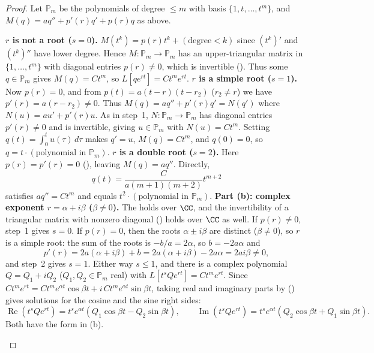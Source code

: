 \documentclass[10pt]{scrartcl}
\begin{document}
\begin{proof}
  Let $\mathbb P_m$ be the polynomials of degree $\le m$ with basis $\{1,t,\dots,t^m\}$, and $M(q)=aq''+p'(r)q'+p(r)q$ as above.
  \begin{steps}
    \ii \textbf{$r$ is not a root ($s=0$).} $M(t^k)=p(r)t^k+(\text{degree}<k)$ since $(t^k)'$ and $(t^k)''$ have lower degree. Hence $M:\mathbb P_m\to\mathbb P_m$ has an upper-triangular matrix in $\{1,\dots,t^m\}$ with diagonal entries $p(r)\neq 0$, which is invertible (). Thus some $q\in\mathbb P_m$ gives $M(q)=Ct^m$, so $L[qe^{rt}]=Ct^me^{rt}$.
    \ii \textbf{$r$ is a simple root ($s=1$).} Now $p(r)=0$, and from $p(t)=a(t-r)(t-r_2)$ ($r_2\neq r$) we have $p'(r)=a(r-r_2)\neq 0$. Thus $M(q)=aq''+p'(r)q'=N(q')$ where $N(u)=au'+p'(r)u$. As in step~1, $N:\mathbb P_m\to\mathbb P_m$ has diagonal entries $p'(r)\neq 0$ and is invertible, giving $u\in\mathbb P_m$ with $N(u)=Ct^m$. Setting $q(t)=\int_0^t u(\tau)\,d\tau$ makes $q'=u$, $M(q)=Ct^m$, and $q(0)=0$, so $q=t\cdot(\text{polynomial in }\mathbb P_m)$.
    \ii \textbf{$r$ is a double root ($s=2$).} Here $p(r)=p'(r)=0$ (), leaving $M(q)=aq''$. Directly,
    \[
      q(t) = \frac{C}{a(m+1)(m+2)}t^{m+2}
    \]
    satisfies $aq''=Ct^m$ and equals $t^2\cdot(\text{polynomial in }\mathbb P_m)$.
    \ii \textbf{Part (b): complex exponent $r=\alpha+i\beta$ ($\beta\neq 0$).} The  holds over $\CC$, and the invertibility of a triangular matrix with nonzero diagonal () holds over $\CC$ as well. If $p(r)\neq 0$, step~1 gives $s=0$. If $p(r)=0$, then the roots $\alpha\pm i\beta$ are distinct ($\beta\neq 0$), so $r$ is a simple root: the sum of the roots is $-b/a=2\alpha$, so $b=-2a\alpha$ and
    \[
      p'(r)=2a(\alpha+i\beta)+b=2a(\alpha+i\beta)-2a\alpha=2ai\beta\neq 0,
    \]
    and step~2 gives $s=1$. Either way $s\le 1$, and there is a complex polynomial $Q=Q_1+iQ_2$ ($Q_1,Q_2\in\mathbb P_m$ real) with $L[t^s Qe^{rt}]=Ct^m e^{rt}$.
    \ii Since $Ct^me^{rt}=Ct^me^{\alpha t}\cos\beta t+i\,Ct^me^{\alpha t}\sin\beta t$, taking real and imaginary parts by () gives solutions for the cosine and the sine right sides:
    \[
      \operatorname{Re}(t^s Qe^{rt}) = t^s e^{\alpha t}(Q_1\cos\beta t - Q_2\sin\beta t),\qquad
      \operatorname{Im}(t^s Qe^{rt}) = t^s e^{\alpha t}(Q_2\cos\beta t + Q_1\sin\beta t).
    \]
    Both have the form in (b). \qedhere
  \end{steps}
\end{proof}
\end{document}
